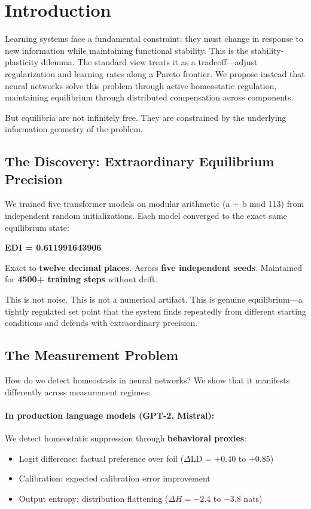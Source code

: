 \section{Introduction}\label{sec:intro}

Learning systems face a fundamental constraint: they must change in response to new information while maintaining functional stability. This is the stability-plasticity dilemma. The standard view treats it as a tradeoff—adjust regularization and learning rates along a Pareto frontier. We propose instead that neural networks solve this problem through active homeostatic regulation, maintaining equilibrium through distributed compensation across components.

But equilibria are not infinitely free. They are constrained by the underlying information geometry of the problem.

\subsection{The Discovery: Extraordinary Equilibrium Precision}

We trained five transformer models on modular arithmetic (a + b mod 113) from independent random initializations. Each model converged to the exact same equilibrium state:

\begin{center}
\textbf{EDI = 0.611991643906}
\end{center}

Exact to \textbf{twelve decimal places}. Across \textbf{five independent seeds}. Maintained for \textbf{4500+ training steps} without drift.

This is not noise. This is not a numerical artifact. This is genuine equilibrium—a tightly regulated set point that the system finds repeatedly from different starting conditions and defends with extraordinary precision.

\subsection{The Measurement Problem}

How do we detect homeostasis in neural networks? We show that it manifests differently across measurement regimes:

\paragraph{In production language models (GPT-2, Mistral):}
We detect homeostatic suppression through \textbf{behavioral proxies}:
\begin{itemize}
\item Logit difference: factual preference over foil ($\Delta$LD = +0.40 to +0.85)
\item Calibration: expected calibration error improvement
\item Output entropy: distribution flattening ($\Delta H = -2.4$ to $-3.8$ nats)
\end{itemize}

